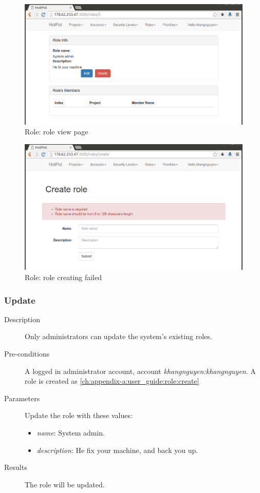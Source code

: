 \begin{figure}[bth]
\myfloatalign
\includegraphics[width=1.0\linewidth]{gfx/chapter_5/role/role_view}
\caption[Role: role view page]{Role: role view page}
\label{fig:user_guide:role:role_view}
\end{figure}

\begin{figure}[bth]
\myfloatalign
\includegraphics[width=1.0\linewidth]{gfx/chapter_5/role/role_create_failed}
\caption[Role: role create]{Role: role creating failed}
\label{fig:user_guide:role:role_create_failed}
\end{figure}

\clearpage

\subsubsection{Update}
\label{ch:appendix-a:user_guide:role:update}

\begin{description}
\item[Description] Only administrators can update the system's existing roles.
\item[Pre-conditions] A logged in administrator account, \eg account \emph{khangnguyen:khangnguyen}.
A role is created as \autoref{ch:appendix-a:user_guide:role:create}
\item[Parameters] Update the role with these values:
\begin{itemize}
\item \emph{name}: System admin.
\item \emph{description}: He fix your machine, and back you up.
\end{itemize}
\item[Results] The role will be updated.
\end{description}

